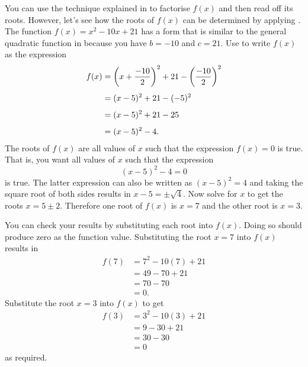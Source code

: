\documentclass[a4paper,oneside,12pt]{article}
\begin{document}
\begin{solution}
You can use the technique explained
in  to factorise $f(x)$
and then read off its roots.  However, let's see how the roots of
$f(x)$ can be determined by applying
.  The function
$f(x) = x^2 - 10x + 21$ has a form that is similar to the general
quadratic function in 
because you have $b = -10$ and $c = 21$.  Use
 to write $f(x)$ as the
expression
\begin{align*}
f(x)
&=
\parenthesis*{x + \frac{-10}{2}}^2
+
21 - \parenthesis*{\frac{-10}{2}}^2 \\[4pt]
&=
(x - 5)^2
+
21 - (-5)^2 \\[4pt]
&=
(x - 5)^2 + 21 - 25 \\[4pt]
&=
(x - 5)^2 - 4.
\end{align*}
The roots of $f(x)$ are all values of $x$ such that the expression
$f(x) = 0$ is true.  That is, you want all values of $x$ such that the
expression
\[
(x - 5)^2 - 4
=
0
\]
is true.  The latter expression can also be written as
$(x - 5)^2 = 4$ and taking the square root of both sides results in
$x - 5 = \pm\sqrt{4}$.  Now solve for $x$ to get the roots
$x = 5 \pm 2$.  Therefore one root of $f(x)$ is $x = 7$ and the other
root is $x = 3$.

You can check your results by substituting each root into $f(x)$.
Doing so should produce zero as the function value.  Substituting the
root $x = 7$ into $f(x)$ results in
\begin{align*}
f(7)
&=
7^2 - 10(7) + 21 \\[4pt]
&=
49 - 70 + 21 \\[4pt]
&=
70 - 70 \\[4pt]
&=
0.
\end{align*}
Substitute the root $x = 3$ into $f(x)$ to get
\begin{align*}
f(3)
&=
3^2 - 10(3) + 21 \\[4pt]
&=
9 - 30 + 21 \\[4pt]
&=
30 - 30 \\[4pt]
&=
0
\end{align*}
as required.


\end{solution}
\end{document}
